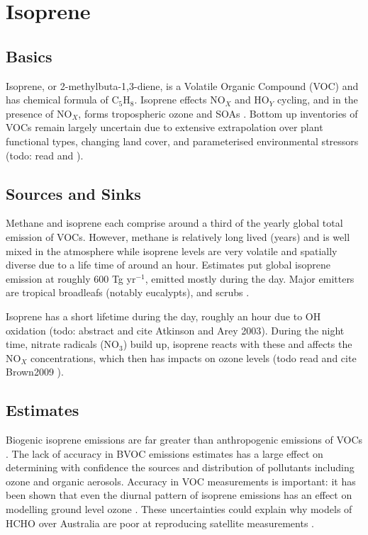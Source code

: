 \section{Isoprene}
\label{ch1:sec:isoprene}

  \subsection{Basics}
    Isoprene, or 2-methylbuta-1,3-diene, is a Volatile Organic Compound (VOC) and has chemical formula of C$_5$H$_8$. 
    Isoprene effects NO$_X$ and HO$_Y$ cycling, and in the presence of NO$_X$, forms tropospheric ozone and SOAs \citep{Wagner2002, Millet2006}.
    Bottom up inventories of VOCs remain largely uncertain due to extensive extrapolation over plant functional types, changing land cover, and parameterised environmental stressors (todo: read and \citep{Guenther2000}).
    

  \subsection{Sources and Sinks}
    Methane and isoprene each comprise around a third of the yearly global total emission of VOCs.
    However, methane is relatively long lived (years) and is well mixed in the atmosphere while isoprene levels are very volatile and spatially diverse due to a life time of around an hour.
    Estimates put global isoprene emission at roughly 600 Tg yr$^{-1}$, emitted mostly during the day.
    Major emitters are tropical broadleafs (notably eucalypts), and scrubs \citep{Guenther2006, Arneth2008, Niinemets2010, Monks2015}.
    
    Isoprene has a short lifetime during the day, roughly an hour due to OH oxidation (todo: abstract and cite Atkinson and Arey 2003\citep{AtkinsenArey2003}).
    During the night time, nitrate radicals (NO$_3$) build up, isoprene reacts with these and affects the NO$_X$ concentrations, which then has impacts on ozone levels (todo read and cite Brown2009 \citep{Brown2009, Mao2013}).
    
  \subsection{Estimates}
    Biogenic isoprene emissions are far greater than anthropogenic emissions of VOCs \citep{Guenther2006, Kefauver2014}. 
    The lack of accuracy in BVOC emissions estimates has a large effect on determining with confidence the sources and distribution of pollutants including ozone and organic aerosols.
    Accuracy in VOC measurements is important: it has been shown that even the diurnal pattern of isoprene emissions has an effect on modelling ground level ozone \citep{Hewitt_2011,Fan_2004}.
    These uncertainties could explain why models of HCHO over Australia are poor at reproducing satellite measurements \citep{Stavrakou2009}.

